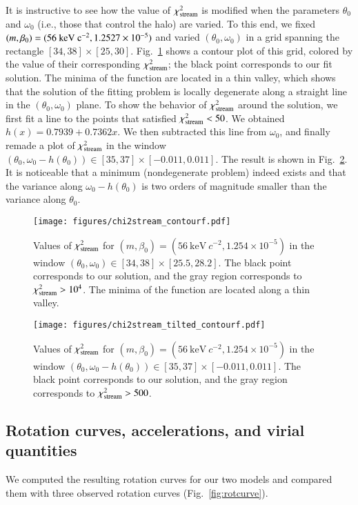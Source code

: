 \documentclass[referee]{aa} %
\begin{document}
It is instructive to see how the value of $\chi^2_{\rm{stream}}$ is modified when the parameters $\theta_0$ and $\omega_0$ (i.e., those that control the halo) are varied. To this end, we fixed $(m, \beta_0)=(56~\rm{keV}~c^{-2}, 1.2527\times10^{-5})$ and varied $(\theta_0, \omega_0)$ in a grid spanning the rectangle $[34, 38]\times[25, 30]$.
Fig.~\ref{fig:chi2stream} shows a contour plot of this grid, colored by the value of their corresponding $\chi^2_{\rm{stream}}$; the black point corresponds to our fit solution.
The minima of the function are located in a thin valley, which shows that the solution of the fitting problem is locally degenerate along a straight line in the $(\theta_0, \omega_0)$ plane.
To show the behavior of $\chi^2_{\rm{stream}}$ around the solution, we first fit a line to the points that satisfied $\chi^2_{\rm{stream}}<50$. We
obtained $h(x)= 0.7939+0.7362x$. We then subtracted this line from $\omega_0$, and finally remade a plot of $\chi^2_{\rm{stream}}$ in the window $(\theta_0, \omega_0-h(\theta_0))\in[35, 37]\times[-0.011,0.011]$. The result is shown in Fig.~\ref{fig:chi2stream_tilted}. It is noticeable that a minimum (nondegenerate problem) indeed exists and that
the variance along $\omega_0-h(\theta_0)$ is two orders of magnitude smaller than the variance along $\theta_0$.
%
\begin{figure}
   \centering
   \texttt{[image: figures/chi2stream\_contourf.pdf]}
   \caption{Values of $\chi^2_{\rm{stream}}$ for $(m, \beta_0)=(56~\mathrm{keV}~c^{-2}, 1.254\times10^{-5})$ in the window $(\theta_0, \omega_0)\in[34, 38]\times[25.5,28.2]$. The black point corresponds to our solution, and the gray region corresponds to $\chi^2_{\rm{stream}} >10^4$. The minima of the function are located along a thin valley.}
   \label{fig:chi2stream}
\end{figure}
\begin{figure}
   \centering
   \texttt{[image: figures/chi2stream\_tilted\_contourf.pdf]}
   \caption{Values of $\chi^2_{\rm{stream}}$ for $(m, \beta_0)=(56~\mathrm{keV}~c^{-2}, 1.254\times10^{-5})$ in
   the window $(\theta_0, \omega_0-h(\theta_0))\in[35, 37]\times[-0.011,0.011]$. The black point corresponds to our solution, and the gray region corresponds to $\chi^2_{\rm{stream}} > 500 $. }
   \label{fig:chi2stream_tilted}
\end{figure}

\subsection{Rotation curves, accelerations, and virial quantities}
We computed the resulting rotation curves for our two models and compared them with three observed rotation curves (Fig.~\ref{fig:rotcurve}).
\end{document}
